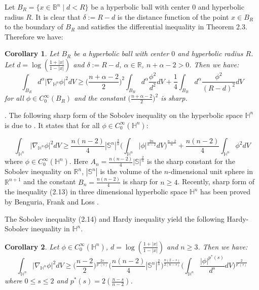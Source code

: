 \documentclass[12pt]{amsart}
\numberwithin{equation}{section}
\numberwithin{theorem}{section}
\numberwithin{theorem}{section} \numberwithin{lemma}{section}
\numberwithin{definition}{section}
\newtheorem{corollary}{Corollary}
\numberwithin{corollary}{section}
\numberwithin{remark}{section}
\numberwithin{proposition}{section}
\begin{document}
Let $B_R=\{x\in \mathbb{B}^n\mid d<R\}$ be a hyperbolic ball with
center $0$ and hyperbolic radius $R$. It is clear that $\delta:=R-d$
is the distance function of the point $x\in B_R$ to the boundary of
$B_R$ and satisfies the differential inequality in Theorem 2.3.
Therefore we have:
\begin{corollary} Let $B_R$ be a hyperbolic ball with center $0$ and hyperbolic radius $R$.
 Let $d=\log(\frac{1+|x|}{1-|x|})$ and $\delta:=R-d$, $\alpha\in \mathbb{R}$,
$n+\alpha-2>0$. Then we have:
\begin{equation}\int_{B_R} d^{\alpha}|\nabla_{\mathbb{H}^n} \phi|^2dV
\ge \Big(\frac{n+\alpha-2}{2}\Big)^2 \int_{B_R}
d^{\alpha}\frac{\phi^2}{d^2}dV+\frac{1}{4}\int_{B_R}d^{\alpha}\frac{\phi^2}{(R-d)^2}dV\end{equation}
for all  $\phi\in C_0^{\infty}(B_R)$ and the constant
$\big(\frac{n+\alpha-2}{2}\big)^2$ is sharp.
\end{corollary}
\medskip

. The
following sharp form of the Sobolev inequality on the hyperbolic
space $\mathbb{H}^n$ is due to \cite{Hebey}. It states that for all
$\phi\in C_0^{\infty}(\mathbb{H}^n)$:

\begin{equation}\int_{
\mathbb{H}^n }|\nabla_{\mathbb{H}^n}\phi|^2dV\ge
\frac{n(n-2)}{4}|\mathbb{S}^n|^{\frac{2}{n}}\Big(\int_ {\mathbb
{H}^n}|\phi|^{\frac{2n}{n-2}}dV\Big)^{\frac{n-2}{n}}+\frac{n(n-2)}{4}\int_{
\mathbb{H}^n} \phi^2dV
 \end{equation}where $
 \phi\in C_0^{\infty}(\mathbb{H}^n)$. Here $A_n=\frac{n(n-2)}{4}|\mathbb{S}|^{\frac{2}{n}}$ is the sharp
constant for the Sobolev inequality on $\mathbb{R}^n$,
$|\mathbb{S}^n|$ is the volume of the $n$-dimensional unit sphere in
$\mathbb{R}^{n+1}$ and the constant $ B_n=\frac{n(n-2)}{4}$ is sharp
for $n\ge 4$. Recently, sharp form of the inequality (2.13) in
three dimensional hyperbolic space $\mathbb{H}^n$ has been proved by
Benguria, Frank and Loss \cite{Benguria}.
\medskip

The Sobolev inequality (2.14) and  Hardy inequality
\cite{Kombe-Ozaydin} yield the following Hardy-Sobolev inequality in
$\mathbb{H}^n$.

\begin{corollary} Let $\phi\in C_0^{\infty}(\mathbb{H}^n)$, $d=\log(\frac{1+|x|}{1-|x|})$ and $n\ge 3$. Then we have:
\[\int_{ \mathbb{H}^n }|\nabla_{\mathbb{H}^n}\phi|^2dV\ge
\Big(\frac{n-2}{2}\Big)^{\frac{2s}{p^{*}(s)}}
\Big(\frac{n(n-2)}{4}|\mathbb{S}^n|^{\frac{2}{n}}\Big)
  ^{\frac{n(2-s)}{2(n-s)}}\Big(\int_ {\mathbb
{H}^n}\frac{|\phi|^{p^{*}(s)}}{d^s}dV\Big)^{\frac{2}{p^{*}(s)}}
\] where $0\le s\le 2$ and  $p^{*}(s)=2 (\frac{n-s}{n-2})$.
\end{corollary}
\medskip
\end{document}
